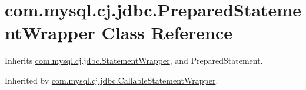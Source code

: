 \hypertarget{classcom_1_1mysql_1_1cj_1_1jdbc_1_1_prepared_statement_wrapper}{}\section{com.\+mysql.\+cj.\+jdbc.\+Prepared\+Statement\+Wrapper Class Reference}
\label{classcom_1_1mysql_1_1cj_1_1jdbc_1_1_prepared_statement_wrapper}


Inherits \mbox{\hyperlink{classcom_1_1mysql_1_1cj_1_1jdbc_1_1_statement_wrapper}{com.\+mysql.\+cj.\+jdbc.\+Statement\+Wrapper}}, and Prepared\+Statement.



Inherited by \mbox{\hyperlink{classcom_1_1mysql_1_1cj_1_1jdbc_1_1_callable_statement_wrapper}{com.\+mysql.\+cj.\+jdbc.\+Callable\+Statement\+Wrapper}}.

